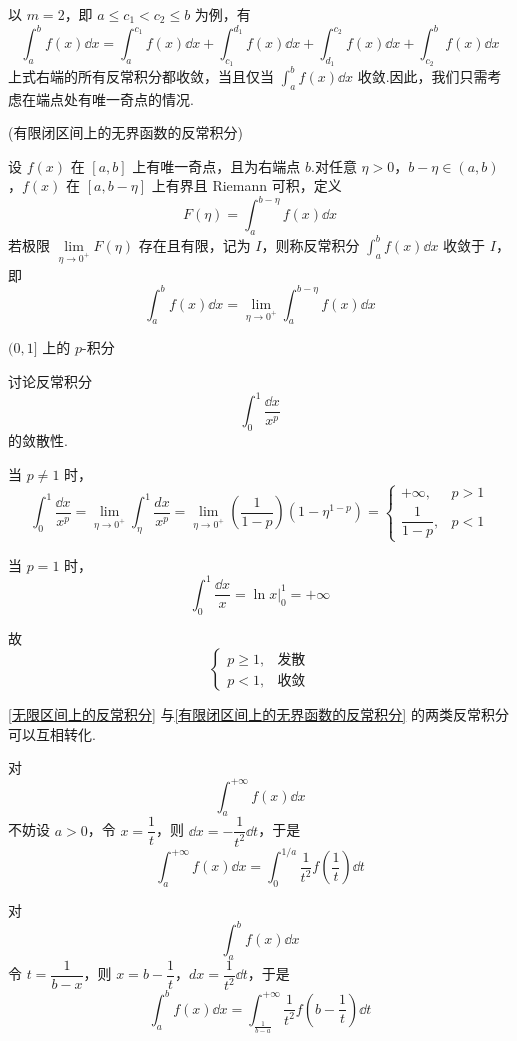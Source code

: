 以 $m=2$，即 $a \le c_1 < c_2 \le b$ 为例，有
\[
\int_a^b f(x)\dd x = \int_a^{c_1} f(x)\dd x + \int_{c_1}^{d_1} f(x)\dd x + \int_{d_1}^{c_2} f(x)\dd x + \int_{c_2}^b f(x)\dd x
\]
上式右端的所有反常积分都收敛，当且仅当 $\displaystyle\int_a^b f(x)\dd x$ 收敛.因此，我们只需考虑在端点处有唯一奇点的情况.
\begin{definition}(有限闭区间上的无界函数的反常积分)\label{有限闭区间上的无界函数的反常积分}
	
	
	设 $f(x)$ 在 $[a,b]$ 上有唯一奇点，且为右端点 $b$.对任意 $\eta>0$，$b-\eta \in (a,b)$，$f(x)$ 在 $[a,b-\eta]$ 上有界且 Riemann 可积，定义
	\[
	F(\eta) = \int_a^{b-\eta} f(x)\dd x
	\]
	若极限 $\lim\limits_{\eta \to 0^+} F(\eta)$ 存在且有限，记为 $I$，则称反常积分 $\displaystyle\int_a^b f(x)\dd x$ 收敛于 $I$，即
	\[
	\int_a^b f(x)\dd x = \lim_{\eta \to 0^+} \int_a^{b-\eta} f(x)\dd x
	\]
\end{definition}
\begin{example}
	$(0,1]$ 上的 $p$-积分
	
	讨论反常积分
	\[
	\int_0^1 \frac{\dd x}{x^p}
	\]
	的敛散性.
\end{example}
\begin{solution}
	当 $p \neq 1$ 时，
	\[
	\int_0^1 \frac{\dd x}{x^p} = \lim_{\eta \to 0^+} \int_\eta^1 \frac{dx}{x^p}
	= \lim_{\eta \to 0^+} \left( \frac{1}{1-p} \right) \left( 1 - \eta^{1-p} \right)
	=
	\begin{cases}
		+\infty, & p>1 \\
		\dfrac{1}{1-p}, & p<1
	\end{cases}
	\]
	
	当 $p=1$ 时，
	\[
	\int_0^1 \frac{\dd x}{x} =\ln x |_0^1 = +\infty
	\]
	
	故
	\[
	\begin{cases}
		p \ge 1, & \text{发散} \\
		p < 1, & \text{收敛}
	\end{cases}
	\]
\end{solution}

\ref{无限区间上的反常积分} 与\ref{有限闭区间上的无界函数的反常积分} 的两类反常积分可以互相转化.

对
\[
\int_a^{+\infty} f(x) \dd x
\]
不妨设 \(a>0\)，令 \(x=\dfrac{1}{t}\)，则 \(\dd x=-\dfrac{1}{t^2}\dd t\)，于是
\[
\int_a^{+\infty} f(x) \dd x = \int_0^{1/a} \frac{1}{t^2} f\left( \frac{1}{t} \right) \dd t
\]

对
\[
\int_a^b f(x) \dd x
\] 
令 \(t=\dfrac{1}{b-x}\)，则 \(x=b-\dfrac{1}{t}\)，\(dx=\dfrac{1}{t^2}\dd t\)，于是
\[
\int_a^b f(x) \dd x = \int_{\tfrac{1}{b-a}}^{+\infty} \frac{1}{t^2} f\left( b-\frac{1}{t} \right) \dd t
\]

